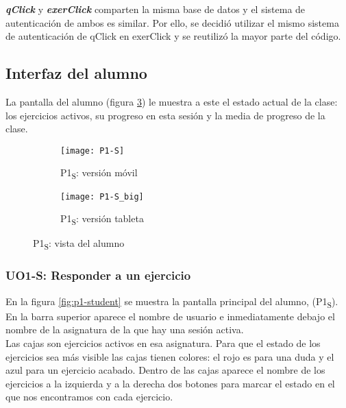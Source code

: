 \textbf{\textit{qClick}} \cite{qclick} y \textbf{\textit{exerClick}} comparten la misma base de datos y el sistema de autenticación de ambos es similar. Por ello, se decidió utilizar el mismo sistema de autenticación de qClick en exerClick y se reutilizó la mayor parte del código.\\

\subsection{Interfaz del alumno}
\label{diseno-e-implementacion:interfaces:alumno}

La pantalla del alumno (figura \ref{diseno-e-implementacion:interfaces:alumno}) le muestra a este el estado actual de la clase: los ejercicios activos, su progreso en esta sesión y la media de progreso de la clase.

\noindent
\begin{figure}[!htbp]
\begin{subfigure}[t]{0.3\textwidth}
	\centering
	\texttt{[image: P1-S]}
	\caption{P1\textsubscript{S}: versión móvil}
	\label{fig:diseno-e-implementacion:interfaces:alumno:p1}
\end{subfigure}
%
\begin{subfigure}[t]{0.7\textwidth}
	\centering
	\texttt{[image: P1-S\_big]}
	\caption{P1\textsubscript{S}: versión tableta}
	\label{fig:diseno-e-implementacion:interfaces:alumno:p1_big}
\end{subfigure}

\caption{P1\textsubscript{S}: vista del alumno}
\label{diseno-e-implementacion:interfaces:alumno}
\end{figure}

\subsubsection{UO1-S: Responder a un ejercicio}
\label{diseno-e-implementacion:interfaces:alumno:uo1-s}

En la figura \ref{fig:p1-student} se muestra la pantalla principal del alumno, (P1\textsubscript{S}). En la barra superior aparece el nombre de usuario e inmediatamente debajo el nombre de la asignatura de la que hay una sesión activa.\\

Las cajas son ejercicios activos en esa asignatura. Para que el estado de los ejercicios sea más visible las cajas tienen colores: el rojo es para una duda y el azul para un ejercicio acabado. Dentro de las cajas aparece el nombre de los ejercicios a la izquierda y a la derecha dos botones para marcar el estado en el que nos encontramos con cada ejercicio.\\

